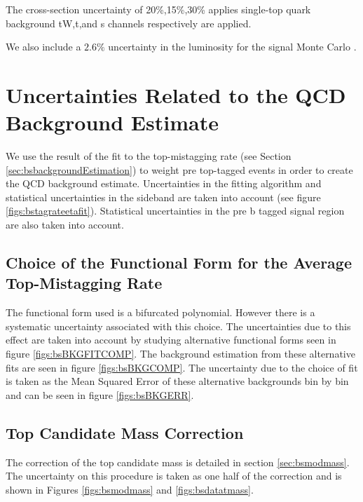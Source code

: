 The cross-section uncertainty of 20\%,15\%,30\% applies single-top quark background tW,t,and s channels respectively are applied.

We also include a $2.6\%$ uncertainty in the luminosity for the signal Monte Carlo \cite{CMS-PAS-LUM-13-001}. 


\clearpage
\section{Uncertainties Related to the QCD Background Estimate}
We use the result of the fit to the top-mistagging rate (see Section \ref{sec:bsbackgroundEstimation}) to weight 
pre top-tagged events in order to create the QCD background estimate.  Uncertainties in
the fitting algorithm and statistical uncertainties in the sideband
are taken into account (see figure \ref{figs:bstagrateetafit}).
Statistical uncertainties in the pre b tagged signal region are also
taken into account.

\subsection{Choice of the Functional Form for the Average Top-Mistagging Rate}
\label{sec:bschoiceoffit}
The functional form used is a bifurcated polynomial.
However there is a systematic uncertainty associated with this choice.
The uncertainties due to this effect are taken into account by
studying alternative functional forms seen in figure
\ref{figs:bsBKGFITCOMP}.  The background estimation from these
alternative fits are seen in figure \ref{figs:bsBKGCOMP}.  The
uncertainty due to the choice of fit is taken as the Mean Squared
Error of these alternative backgrounds bin by bin and can be seen in
figure \ref{figs:bsBKGERR}.  

\subsection{Top Candidate Mass Correction}
\label{sec:bsmascorrerror}
The correction of the top candidate mass is detailed in section \ref{sec:bsmodmass}.  The uncertainty on this procedure is taken as one half of the correction 
and is shown in Figures \ref{figs:bsmodmass} and \ref{figs:bsdatatmass}.   

